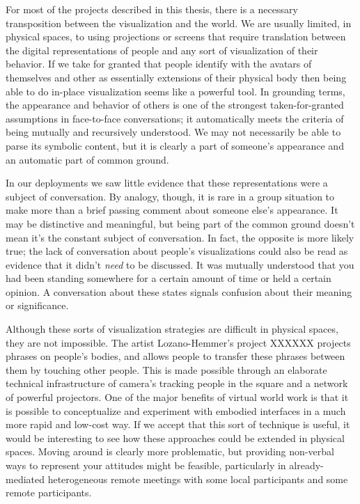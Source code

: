 
For most of the projects described in this thesis, there is a necessary transposition between the visualization and the world. We are usually limited, in physical spaces, to using projections or screens that require translation between the digital representations of people and any sort of visualization of their behavior. If we take for granted that people identify with the avatars of themselves and other as essentially extensions of their physical body  then being able to do in-place visualization seems like a powerful tool. In grounding terms, the appearance and behavior of others is one of the strongest taken-for-granted assumptions in face-to-face conversations; it automatically meets the criteria of being mutually and recursively understood. We may not necessarily be able to parse its symbolic content, but it is clearly a part of someone's appearance and an automatic part of common ground. 

In our deployments we saw little evidence that these representations were a subject of conversation. By analogy, though, it is rare in a group situation to make more than a brief passing comment about someone else's appearance. It may be distinctive and meaningful, but being part of the common ground doesn't mean it's the constant subject of conversation. In fact, the opposite is more likely true; the lack of conversation about people's visualizations could also be read as evidence that it didn't \emph{need} to be discussed. It was mutually understood that you had been standing somewhere for a certain amount of time or held a certain opinion. A conversation about these states signals confusion about their meaning or significance.

Although these sorts of visualization strategies are difficult in physical spaces, they are not impossible. The artist Lozano-Hemmer's project XXXXXX projects phrases on people's bodies, and allows people to transfer these phrases between them by touching other people. This is made possible through an elaborate technical infrastructure of camera's tracking people in the square and a network of powerful projectors. One of the major benefits of virtual world work is that it is possible to conceptualize and experiment with embodied interfaces in a much more rapid and low-cost way. If we accept that this sort of technique is useful, it would be interesting to see how these approaches could be extended in physical spaces. Moving around is clearly more problematic, but providing non-verbal ways to represent your attitudes might be feasible, particularly in already-mediated heterogeneous remote meetings with some local participants and some remote participants.

